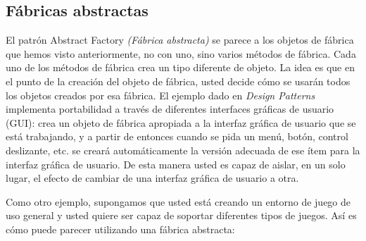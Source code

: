 \subsection*{Fábricas abstractas}
\label{subsec:fa}


El patrón Abstract Factory \textit{(Fábrica abstracta)} se parece a los objetos de fábrica que hemos visto anteriormente, no con uno, sino varios métodos de fábrica. Cada uno de los métodos de fábrica crea un tipo diferente de objeto. La idea es que en el punto de la creación del objeto de fábrica, usted decide cómo se usarán todos los objetos creados por esa fábrica. El ejemplo dado en \textit{Design Patterns} implementa portabilidad a través de diferentes interfaces gráficas de usuario (GUI): crea un objeto de fábrica apropiada a la interfaz gráfica de usuario que se está trabajando, y a partir de entonces cuando se pida un menú, botón, control deslizante, etc. se creará automáticamente la versión adecuada de ese ítem para la interfaz gráfica de usuario. De esta manera usted es capaz de aislar, en un solo lugar, el efecto de cambiar de una interfaz gráfica de usuario a otra.     \newline

Como otro ejemplo, supongamos que usted está creando un entorno de juego de uso general y usted quiere ser capaz de soportar diferentes tipos de juegos. Así es cómo puede parecer utilizando una fábrica abstracta:     \newline

